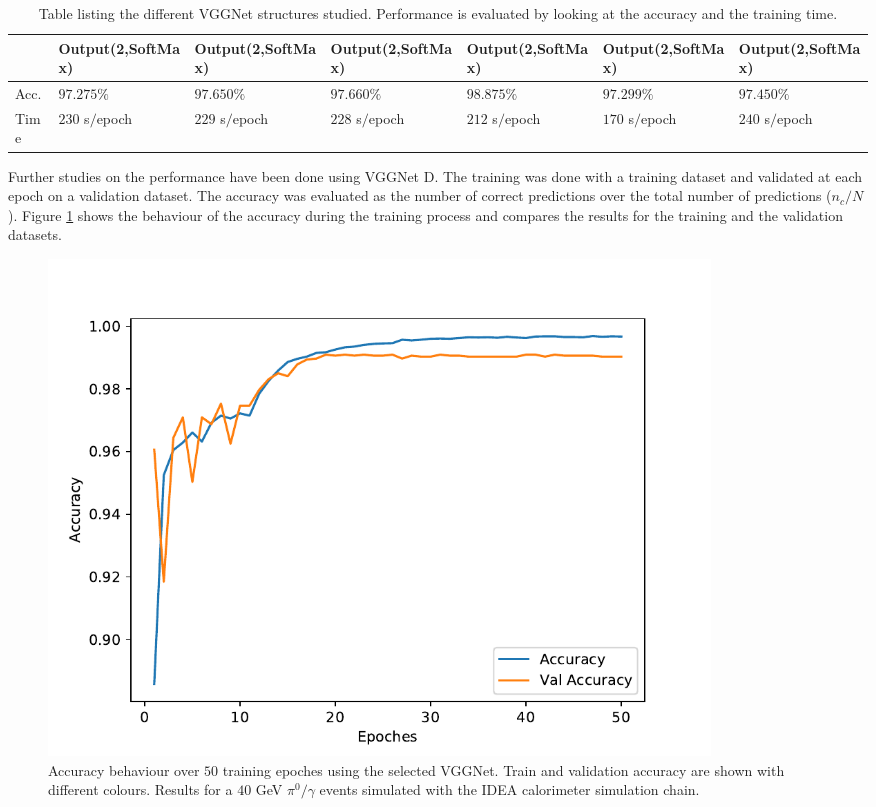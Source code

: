 \begin{table}
\begin{tabular}{l|l|l|l|l|l|l}
         &Output(2,SoftMax) & Output(2,SoftMax) & Output(2,SoftMax) & Output(2,SoftMax) & Output(2,SoftMax) & Output(2,SoftMax) \\
         \midrule
         Acc. & $97.275\%$ & $97.650\%$ & $97.660\%$ & $98.875\%$ & $97.299\%$ & $97.450\%$ \\
         Time &  $230$ s$/$epoch & $229$ s$/$epoch & $228$ s$/$epoch & $212$ s$/$epoch & $170$ s$/$epoch & $240$ s$/$epoch\\
         \bottomrule
    \end{tabular}
    \caption{Table listing the different VGGNet structures studied. Performance is evaluated by looking at the accuracy and the training time.}
    \label{fig:VGGNet-tested}
\end{table}

Further studies on the performance have been done using VGGNet D.
The training was done with a training dataset and validated at each epoch on a validation dataset.
The accuracy was evaluated as the number of correct predictions over the total number of predictions ($n_c/N$). Figure \ref{fig:VGGNet-acc} shows the behaviour of the accuracy during the training process and compares the results for the training and the validation datasets.\\

\begin{figure}
	\centering
	\includegraphics[width=0.85\textwidth]{IMG/Cap6/VGGNet-D_Accuracy.pdf}
	\caption{Accuracy behaviour over $50$ training epoches using the selected VGGNet. Train and validation accuracy are shown with different colours. Results for a $40$ GeV $\pi^0/\gamma$ events simulated with the IDEA calorimeter simulation chain.}
	\label{fig:VGGNet-acc}
\end{figure}

